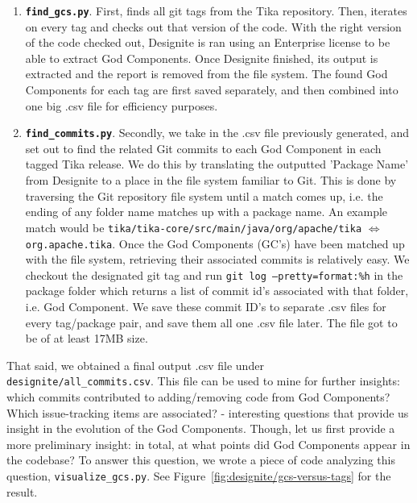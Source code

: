 \documentclass{article}
\begin{document}
\begin{enumerate}
    \item \textbf{\texttt{find\_gcs.py}}. First, finds all git tags from the Tika repository. Then, iterates on every tag and checks out that version of the code. With the right version of the code checked out, Designite is ran using an Enterprise license to be able to extract God Components. Once Designite finished, its output is extracted and the report is removed from the file system. The found God Components for each tag are first saved separately, and then combined into one big .csv file for efficiency purposes.
    \item \textbf{\texttt{find\_commits.py}}. Secondly, we take in the .csv file previously generated, and set out to find the related Git commits to each God Component in each tagged Tika release. We do this by translating the outputted 'Package Name' from Designite to a place in the file system familiar to Git. This is done by traversing the Git repository file system until a match comes up, i.e. the ending of any folder name matches up with a package name. An example match would be \texttt{tika/tika-core/src/main/java/org/apache/tika} $\Leftrightarrow$ \texttt{org.apache.tika}. Once the God Components (GC's) have been matched up with the file system, retrieving their associated commits is relatively easy. We checkout the designated git tag and run \texttt{git log --pretty=format:\%h} in the package folder which returns a list of commit id's associated with that folder, i.e. God Component. We save these commit ID's to separate .csv files for every tag/package pair, and save them all one .csv file later. The file got to be of at least 17MB size.
\end{enumerate}

That said, we obtained a final output .csv file under \texttt{designite/all\_commits.csv}. This file can be used to mine for further insights: which commits contributed to adding/removing code from God Components? Which issue-tracking items are associated? - interesting questions that provide us insight in the evolution of the God Components. Though, let us first provide a more preliminary insight: in total, at what points did God Components appear in the codebase? To answer this question, we wrote a piece of code analyzing this question, \texttt{visualize\_gcs.py}. See Figure~\ref{fig:designite/gcs-versus-tags} for the result.
\end{document}
